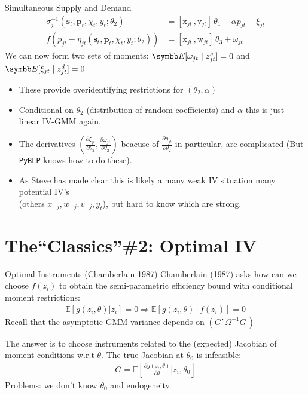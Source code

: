 \documentclass[aspectratio=169,10pt]{beamer}
\begin{document}
\begin{frame}{Simultaneous Supply and Demand}
\begin{align*}
\sigma_j^{-1}(\symbf{s}_t,\symbf{p}_t,\chi_t, y_t; \theta_2) &= [\mathrm{x}_{jt} \,,  \mathrm{v}_{jt}]\, \theta_1 - \alpha p_{jt} + \xi_{jt}\\
f\left(p_{jt}- \eta_{jt}(\symbf{s}_t,\symbf{p}_t,\chi_t, y_t ;\theta_2)  \right) &= [\mathrm{x}_{jt} \,, \mathrm{w}_{jt}]\, \theta_3 +  \omega_{jt}
\end{align*}
We can now form two sets of moments: $\E[\omega_{jt} \mid  z_{jt}^{s}]=0$ and $\E[\xi_{jt} \mid  z_{jt}^{d}]=0$
\begin{itemize}
    \item These provide \alert{overidentifying restrictions} for $(\theta_2, \alpha)$
     \item Conditional on $\theta_2$ (distribution of random coefficients) and $\alpha$ this is just linear IV-GMM again.
     \item The derivatives $\left(\frac{\partial \xi_{jt}}{\partial \theta_2}, \frac{\partial \omega_{jt}}{\partial \theta_2} \right)$ beacuse of $\frac{\partial \eta_{jt}}{\partial \theta_2}$ in particular, are complicated (But \texttt{PyBLP} knows how to do these).
     \item As Steve has made clear this is likely a \alert{many weak IV} situation many potential IV's\\
      (others $x_{-j},w_{-j},v_{-j},y_t$), but hard to know which are strong.
\end{itemize}
\end{frame}


\section*{The``Classics''\#2: Optimal IV}

\begin{frame}{Optimal Instruments (Chamberlain 1987)}
Chamberlain (1987) asks how can we choose $f(z_i)$ to obtain the semi-parametric efficiency bound with conditional moment restrictions:
\begin{align*}
\mathbb{E}[g(z_i,\theta) | z_i]=0 \Rightarrow \mathbb{E}[g(z_i,\theta) \cdot f(z_i) ]=0 
\end{align*}
Recall that the asymptotic GMM variance depends on $(G'\, \Omega^{-1} G\,)$

The answer is to choose instruments related to the (expected) Jacobian of moment conditions w.r.t $\theta$. The true Jacobian at $\theta_0$ is \alert{infeasible}:
\begin{align*}
G=\mathbb{E}\left[\frac{\partial g(z_i,\theta)}{\partial \theta} | z_i, \theta_0 \right]
\end{align*}
Problems: we don't know $\theta_0$ and endogeneity.
\end{frame}
\end{document}
